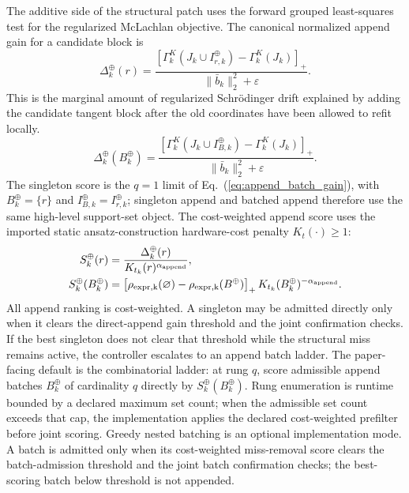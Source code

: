 \documentclass[
  reprint,
  amsmath,
  amssymb,
  aps,
  pra,
  nofootinbib,
  superscriptaddress,
  floatfix
]{revtex4-2}
\newcommand{\app}{\mathrm{append}}
\newcommand{\eps}{\varepsilon}
\begin{document}
The additive side of the structural patch uses the forward grouped least-squares test for the regularized McLachlan objective. The canonical normalized append gain for a candidate block is
\begin{equation}
\Delta_k^{\oplus}(r)
=
\frac{
\left[
\Gamma_k^{K}(J_k\cup I_{r,k}^{\oplus})
-
\Gamma_k^{K}(J_k)
\right]_+
}{
\|\bar b_k\|_2^2+\eps
}.
\label{eq:append_grouped_gain}
\end{equation}
This is the marginal amount of regularized Schr\"odinger drift explained by adding the candidate tangent block after the old coordinates have been allowed to refit locally.
\begin{equation}
\Delta_k^{\oplus}(B_k^{\oplus})
=
\frac{
\left[
\Gamma_k^{K}(J_k\cup I_{B,k}^{\oplus})
-
\Gamma_k^{K}(J_k)
\right]_+
}{
\|\bar b_k\|_2^2+\eps
}.
\label{eq:append_batch_gain}
\end{equation}
The singleton score is the \(q=1\) limit of Eq.~(\ref{eq:append_batch_gain}),
with \(B_k^{\oplus}=\{r\}\) and \(I_{B,k}^{\oplus}=I_{r,k}^{\oplus}\); singleton append and
batched append therefore use the same high-level support-set object.
The cost-weighted append score uses the imported static ansatz-construction hardware-cost penalty \(K_t(\cdot)\ge1\):
\begin{equation*}
\begin{aligned}
S_k^{\oplus}(r)
&=
\frac{\Delta_k^{\oplus}(r)}
{K_{t_k}(r)^{\alpha_{\app}}},
\\
S_k^{\oplus}(B_k^{\oplus})
&=
\left[\rho_{\rm expr,k}(\varnothing)-\rho_{\rm expr,k}(B^{\oplus})\right]_+
K_{t_k}(B_k^{\oplus})^{-\alpha_{\app}}.
\end{aligned}
\end{equation*}
All append ranking is cost-weighted.  A singleton may be admitted directly only when it clears the direct-append gain threshold and the joint confirmation checks.  If the best singleton does not clear that threshold while the structural miss remains active, the controller escalates to an append batch ladder.  The paper-facing default is the combinatorial ladder: at rung \(q\), score admissible append batches \(B_k^{\oplus}\) of cardinality \(q\) directly by \(S_k^{\oplus}(B_k^{\oplus})\).  Rung enumeration is runtime bounded by a declared maximum set count; when the admissible set count exceeds that cap, the implementation applies the declared cost-weighted prefilter before joint scoring.  Greedy nested batching is an optional implementation mode.  A batch is admitted only when its cost-weighted miss-removal score clears the batch-admission threshold and the joint batch confirmation checks; the best-scoring batch below threshold is not appended.
\end{document}
